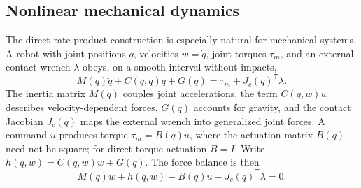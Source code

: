 \subsection{Nonlinear mechanical dynamics}
The direct rate-product construction is especially natural for mechanical
systems. A robot with joint positions $q$, velocities $w=\dot q$, joint
torques $\tau_m$, and an external contact wrench $\lambda$ obeys, on a
smooth interval without impacts, 
\begin{equation}
M(q)\ddot q+C(q,\dot q)\dot q+G(q) =\tau_m+J_c(q)^{\mathsf{T}}\lambda.
\label{eq:mechanical}
\end{equation}
The inertia matrix $M(q)$ couples joint accelerations, the term $C(q,w)w$
describes velocity-dependent forces, $G(q)$ accounts for gravity, and the
contact Jacobian $J_c(q)$ maps the external wrench into generalized joint
forces. A command $u$ produces torque $\tau_m=B(q)u$, where the actuation
matrix $B(q)$ need not be square; for direct torque actuation $B=I$. Write $%
h(q,w)=C(q,w)w+G(q)$. The force balance is then 
\begin{equation}
M(q)\dot w+h(q,w)-B(q)u-J_c(q)^{\mathsf{T}}\lambda=0.
\label{eq:mechanical_balance}
\end{equation}

